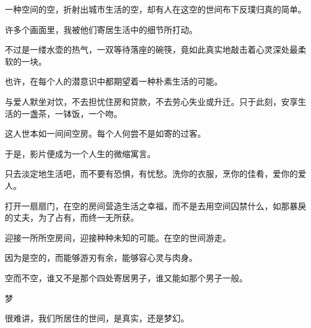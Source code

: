 \documentclass[12pt,a4paper]{article}
\newcommand{\subpart}[1]{
	\begingroup \par
	\vspace{1ex} \centering #1
	\par \endgroup \nopagebreak[4]
}
\begin{document}
		一种空间的空，折射出城市生活的空，却有人在这空的世间布下反璞归真的简单。\par
		许多个画面里，我被他们寄居生活中的细节所打动。\par
		不过是一缕水壶的热气，一双等待落座的碗筷，竟如此真实地敲击着心灵深处最柔软的一块。\par
		也许，在每个人的潜意识中都期望着一种朴素生活的可能。\par
		与爱人默坐对饮，不去担忧住房和贷款，不去劳心失业或升迁。只于此刻，安享生活的一盏茶，一钵饭，一个吻。\par
		这人世本如一间间空房。每个人何尝不是如寄的过客。\par
		于是，影片便成为一个人生的微缩寓言。\par
		只去淡定地生活吧，而不要有恐惧，有忧愁。洗你的衣服，烹你的佳肴，爱你的爱人。\par
		打开一扇扇门，在空的房间营造生活之幸福，而不是去用空间囚禁什么，如那暴戾的丈夫，为了占有，而终一无所获。\par
		迎接一所所空房间，迎接种种未知的可能。在空的世间游走。\par
		因为是空的，而能够游刃有余，能够容心灵与肉身。\par
		空而不空，谁又不是那个四处寄居男子，谁又能如那个男子一般。


		\subpart{梦}

		很难讲，我们所居住的世间，是真实，还是梦幻。
\end{document}
